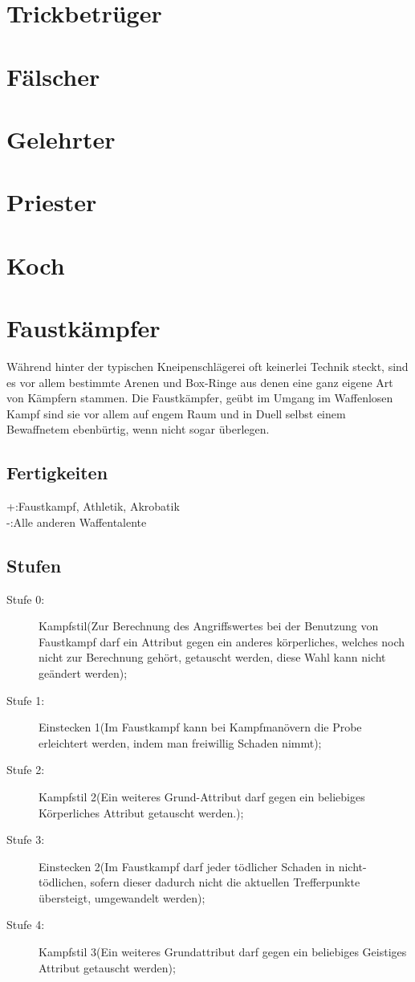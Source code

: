 \documentclass[a4paper,12pt,oneside]{book}
\begin{document}
\section{Trickbetrüger}
\section{Fälscher}
\section{Gelehrter}
\section{Priester}
\section{Koch}
\section{Faustkämpfer}
Während hinter der typischen Kneipenschlägerei oft keinerlei Technik steckt, sind es vor allem bestimmte Arenen und Box-Ringe aus denen eine ganz eigene Art von Kämpfern stammen. Die Faustkämpfer, geübt im Umgang im Waffenlosen Kampf sind sie vor allem auf engem Raum und in Duell selbst einem Bewaffnetem ebenbürtig, wenn nicht sogar überlegen.
\subsection{Fertigkeiten}
+:Faustkampf, Athletik, Akrobatik
\\-:Alle anderen Waffentalente 
\subsection{Stufen}
\begin{description}
\item[Stufe 0:]Kampfstil(Zur Berechnung des Angriffswertes bei der Benutzung von Faustkampf darf ein Attribut gegen ein anderes körperliches, welches noch nicht zur Berechnung gehört, getauscht werden, diese Wahl kann nicht geändert werden); 
\item[Stufe 1:]Einstecken 1(Im Faustkampf kann bei Kampfmanövern die Probe erleichtert werden, indem man freiwillig Schaden nimmt);
\item[Stufe 2:]Kampfstil 2(Ein weiteres Grund-Attribut darf gegen ein beliebiges Körperliches Attribut getauscht werden.);
\item[Stufe 3:]Einstecken 2(Im Faustkampf darf jeder tödlicher Schaden in nicht-tödlichen, sofern dieser dadurch nicht die aktuellen Trefferpunkte übersteigt, umgewandelt werden);
\item[Stufe 4:]Kampfstil 3(Ein weiteres Grundattribut darf gegen ein beliebiges Geistiges Attribut getauscht werden);
\end{description}
\end{document}
